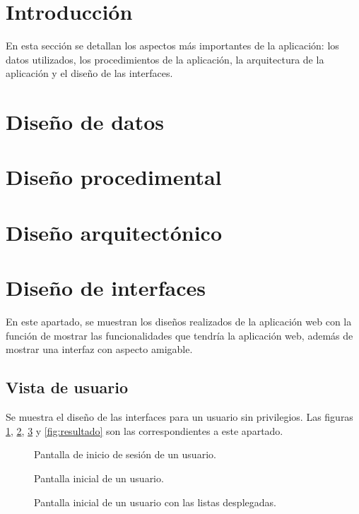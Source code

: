
\section{Introducción}
En esta sección se detallan los aspectos más importantes de la aplicación: los datos utilizados, los procedimientos de la aplicación, la arquitectura de la aplicación y el diseño de las interfaces.

\section{Diseño de datos}

\section{Diseño procedimental}

\section{Diseño arquitectónico}

\section{Diseño de interfaces}
En este apartado, se muestran los diseños realizados de la aplicación web con la función de mostrar las funcionalidades que tendría la aplicación web, además de mostrar una interfaz con aspecto amigable.

\subsection{Vista de usuario}
Se muestra el diseño de las interfaces para un usuario sin privilegios. Las figuras \ref{fig:inicio_de_sesion}, \ref{fig:inicio}, \ref{fig:inicio_1} y \ref{fig:resultado} son las correspondientes a este apartado.
\begin{figure}[h]
	\caption{Pantalla de inicio de sesión de un usuario.}
	\label{fig:inicio_de_sesion}
\end{figure}

\begin{figure}[h]
	\caption{Pantalla inicial de un usuario.}
	\label{fig:inicio}
\end{figure}

\begin{figure}[h]
	\caption{Pantalla inicial de un usuario con las listas desplegadas.}
	\label{fig:inicio_1}
\end{figure}

